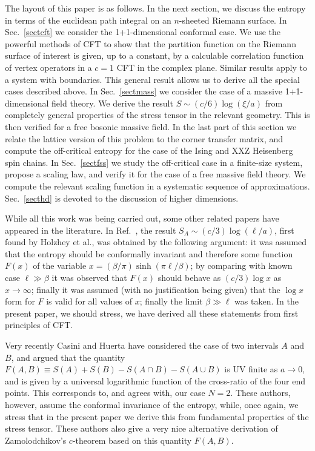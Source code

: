 \documentclass[12pt,aps]{revtex4}
\begin{document}
The layout of this paper is as follows. In the next section, we discuss
the entropy in terms of the euclidean path integral on an $n$-sheeted
Riemann surface. In Sec.~\ref{sectcft} we consider the 1+1-dimensional
conformal case. We use the powerful methods of CFT
to show that the partition function on the Riemann surface of interest
is given, up to a constant, by a calculable correlation function of
vertex operators in a $c=1$ CFT in the complex plane. Similar results
apply to a system with boundaries. This general result allows us to
derive all the special cases described above. In Sec.~\ref{sectmass} we
consider the case of a massive 1+1-dimensional field theory. We derive
the result $S\sim(c/6)\log(\xi/a)$ from completely general properties of
the stress tensor in the relevant geometry. This is then verified for a
free bosonic massive field.
In the last part of this section we relate the
lattice version of this problem to the corner transfer matrix, and
compute the off-critical entropy for the case of the Ising and
XXZ Heisenberg spin chains.
In Sec.~\ref{sectfss} we study the off-critical case in a finite-size
system, propose a scaling law, and verify it for the case of a free
massive field theory. We compute the relevant scaling function in a
systematic sequence of approximations.
Sec.~\ref{secthd} is devoted to the discussion of higher dimensions.

While all this work was being carried out, some other related papers
have appeared in the literature. In Ref.~\cite{Korepin2}, the
result $S_A\sim(c/3)\log(\ell/a)$, first found by Holzhey et
al.\cite{Holzhey},
was obtained by the following argument: it was assumed
that the entropy should be conformally invariant and therefore some
function $F(x)$ of the variable $x=(\beta/\pi)\sinh(\pi\ell/\beta)$;
by comparing with known case $\ell\gg\beta$ \cite{BCN,Affleck} it was
observed that $F(x)$ should behave as $(c/3)\log x$ as $x\to\infty$;
finally it was assumed (with no justification being given) that the
$\log x$ form for $F$ is valid for all values of $x$; finally
the limit $\beta\gg\ell$ was taken. In the present paper, we should
stress, we have derived all these statements from first principles of
CFT.

Very recently Casini and Huerta\cite{Casini} have considered the case
of two intervals $A$ and $B$, and argued that the quantity
$F(A,B)\equiv S(A)+S(B)-S(A\cap B)-S(A\cup B)$ is UV finite as $a\to0$,
and is given by a universal logarithmic function of the cross-ratio
of the four end points. This corresponds to, and agrees with, our case $N=2$.
These authors, however, assume the conformal invariance of the entropy,
while, once again, we stress that in the present paper we derive this from
fundamental
properties of the stress tensor. These authors also give a very nice
alternative derivation of Zamolodchikov's $c$-theorem\cite{Zam} based on
this quantity $F(A,B)$.
\end{document}
